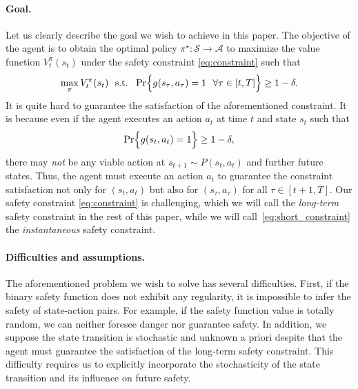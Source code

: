 \documentclass[letterpaper]{article} %
\newcommand{\cA}{\mathcal{A}}
\newcommand{\cS}{\mathcal{S}}
\begin{document}
\paragraph{Goal.}
Let us clearly describe the goal we wish to achieve in this paper.
%
The objective of the agent is to obtain the optimal policy $\pi^\star: \cS \rightarrow \cA$ to maximize the value function $V^\pi_t(s_t)$ under the safety constraint \eqref{eq:constraint} such that
%
\begin{align*}
    \label{eq:opt}
    \max_{\pi} V^\pi_t(s_t)
    \ \  \text{s.t.} \ \
    \Pr \Bigl\{ g(s_\tau, a_\tau) = 1 \ \ \forall \tau \in [t, T] \Big\} \ge 1 - \delta.
\end{align*}
%
It is quite hard to guarantee the satisfaction of the aforementioned constraint.
It is because even if the agent executes an action $a_t$ at time $t$ and state $s_t$ such that
%
\begin{equation}
    \label{eq:short_constraint}
    \Pr\Bigl\{ g(s_t, a_t) = 1 \Big\} \ge 1 - \delta,
\end{equation}
%
there may \textit{not} be any viable action at $s_{t+1} \sim P(s_t, a_t)$ and further future states.
Thus, the agent must execute an action $a_t$ to guarantee the constraint satisfaction not only for $(s_t, a_t)$ but also for $(s_\tau, a_\tau)$ for all $\tau \in [t+1, T]$.
Our safety constraint \eqref{eq:constraint} is challenging, which we will call the \textit{long-term} safety constraint in the rest of this paper, while we will call~\eqref{eq:short_constraint} the \textit{instantaneous} safety constraint.

\paragraph{Difficulties and assumptions.}

The aforementioned problem we wish to solve has several difficulties.
First, if the binary safety function does not exhibit any regularity, it is impossible to infer the safety of state-action pairs.
For example, if the safety function value is totally random, we can neither foresee danger nor guarantee safety.
In addition, we suppose the state transition is stochastic and unknown a priori despite that the agent must guarantee the satisfaction of the long-term safety constraint.
This difficulty requires us to explicitly incorporate the stochasticity of the state transition and its influence on future safety.
\end{document}
